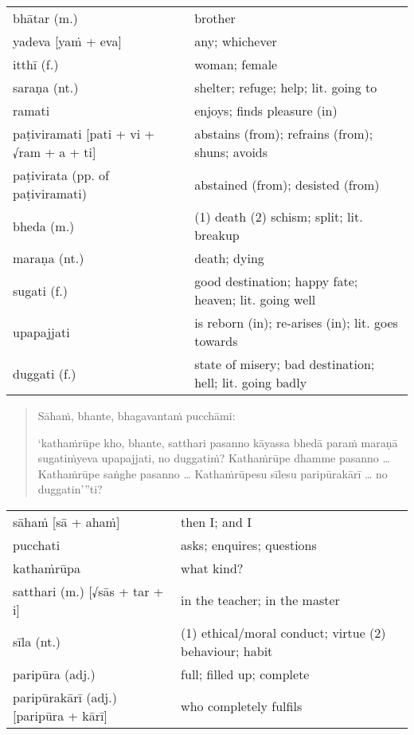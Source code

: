 \documentclass[11pt,oneside]{memoir}
\begin{document}
\begin{longtable}{L{\colOne} L{\colTwo}}
bhātar (m.) & brother\\[0pt]
yadeva [yaṁ + eva] & any; whichever\\[0pt]
itthī (f.) & woman; female\\[0pt]
saraṇa (nt.) & shelter; refuge; help; lit. going to\\[0pt]
ramati & enjoys; finds pleasure (in)\\[0pt]
paṭiviramati [pati + vi + √ram + a + ti] & abstains (from); refrains (from); shuns; avoids\\[0pt]
paṭivirata (pp. of paṭiviramati) & abstained (from); desisted (from)\\[0pt]
bheda (m.) & (1) death (2) schism; split; lit. breakup\\[0pt]
maraṇa (nt.) & death; dying\\[0pt]
sugati (f.) & good destination; happy fate; heaven; lit. going well\\[0pt]
upapajjati & is reborn (in); re-arises (in); lit. goes towards\\[0pt]
duggati (f.) & state of misery; bad destination; hell; lit. going badly\\[0pt]
\end{longtable}

\clearpage

\begin{quote}
Sāhaṁ, bhante, bhagavantaṁ pucchāmi:

‘kathaṁrūpe kho, bhante, satthari pasanno
kāyassa bhedā paraṁ maraṇā sugatiṁyeva upapajjati, no duggatiṁ?
Kathaṁrūpe dhamme pasanno \ldots{}
Kathaṁrūpe saṅghe pasanno \ldots{}
Kathaṁrūpesu sīlesu paripūrakārī \ldots{} no duggatin’”ti?
\end{quote}

\begin{longtable}{L{\colOne} L{\colTwo}}
sāhaṁ [sā + ahaṁ] & then I; and I\\[0pt]
pucchati & asks; enquires; questions\\[0pt]
kathaṁrūpa & what kind?\\[0pt]
satthari (m.) [√sās + tar + i] & in the teacher; in the master\\[0pt]
sīla (nt.) & (1) ethical/moral conduct; virtue (2) behaviour; habit\\[0pt]
paripūra (adj.) & full; filled up; complete\\[0pt]
paripūrakārī (adj.) [paripūra + kārī] & who completely fulfils\\[0pt]
\end{longtable}
\end{document}
